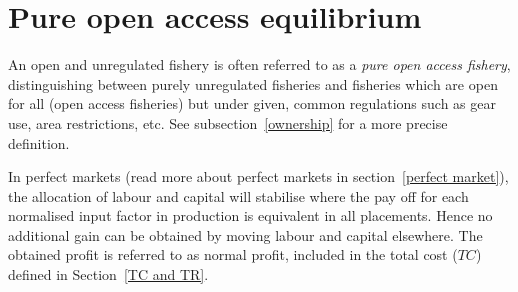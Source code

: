 \documentclass[11pt,fleqn]{book} %
\begin{document}
\section{Pure open access equilibrium}\label{openaccess}
An open and unregulated fishery is often referred to as a \textit{pure open access fishery}, distinguishing between purely unregulated fisheries and fisheries which are open for all (open access fisheries) but under given, common regulations such as gear use, area restrictions, etc. See subsection~\ref{ownership} for a more precise definition.

In perfect markets (read more about perfect markets in section~\ref{perfect market}), the allocation of labour and capital will stabilise where the pay off for each normalised input factor in production is equivalent in all placements. Hence no additional gain can be obtained by moving labour and capital elsewhere. The obtained profit is referred to as normal profit, included in the total cost ($TC$) defined in Section~\ref{TC and TR}.
\end{document}
